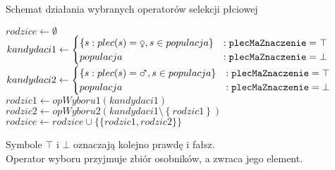 \documentclass[./FM_mgr.tex]{subfiles}
\begin{document}
\begin{algorithm}
	\caption{Schemat działania wybranych operatorów selekcji płciowej \label{algorithm:common_genSel} }
	\begin{algorithmic}[1]
		\Start
		\Var $rodzice \gets \emptyset$
		\label{line:stdGenSelChoose_init_parent}
		\Var $kandydaci1 \gets \begin{cases} 
		\left\{ s: plec(s)=\female, s \in populacja \right\} &: \param{plecMaZnaczenie}=\top\\ 
		populacja &: \param{plecMaZnaczenie}=\bot
		\end{cases} $
		\label{line:stdGenSelChoose_init_candidates_begin}
		\Var $kandydaci2 \gets \begin{cases} 
		\left\{ s: plec(s)=\male, s \in populacja \right\} &: \param{plecMaZnaczenie}=\top\\ 
		populacja &: \param{plecMaZnaczenie}=\bot
		\end{cases} $
		\label{line:stdGenSelChoose_init_candidates_end}
		\label{line:stdGenSelChoose_while}
		\Var $rodzic1 \gets opWyboru1(kandydaci1) $
		\label{line:stdGenSelChoose_choose_begin}
		\Var $rodzic2 \gets opWyboru2(kandydaci1 \setminus \left\{ rodzic1 \right\}) $
		\label{line:stdGenSelChoose_choose_end}
		\State $rodzice \gets rodzice \cup \{  \{ rodzic1, rodzic2 \} \}$
		\label{line:stdGenSelChoose_parents_merge}
		\EndWhile
		\State {}
		\label{line:stdGenSelChoose_return}
		\EndOperator
	\end{algorithmic}
	Symbole $\top$ i $\bot$ oznaczają kolejno prawdę i fałsz.\\
	Operator wyboru przyjmuje zbiór osobników, a zwraca jego element.
\end{algorithm}
\end{document}
